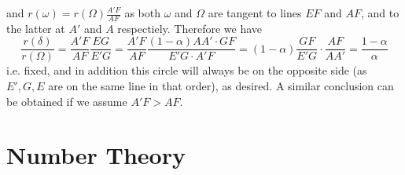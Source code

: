 \documentclass[11pt,a4paper]{article}
\begin{document}
\begin{enumerate}
        and $r(\omega) = r(\Omega) \frac{A'F}{AF}$ as both $\omega$ and $\Omega$ are tangent to lines $EF$ and $AF$, and to the latter at $A'$ and $A$ respectiely. 
        Therefore we have 
        \[
        \frac{r(\delta)}{r(\Omega)}= \frac{A'F}{AF}\frac{EG}{E'G}
        =\frac{A'F}{AF}\frac{(1-\alpha)AA'\cdot GF}{E'G\cdot A'F}=(1-\alpha)\frac{GF}{E'G}\cdot \frac{AF}{AA'}
        =\frac{1-\alpha}{\alpha}
        \]
        i.e. fixed, and in addition this circle will always be on the opposite side (as $E', G, E$ are on the same line in that order), as desired. 
        A similar conclusion can be obtained if we assume $A'F>AF$. 
    \end{enumerate}
    
    \section*{Number Theory}
\end{document}
